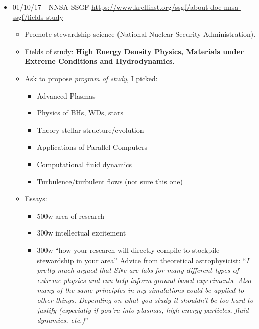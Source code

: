 \documentclass[11pt,
        usenames, %
        dvipsnames %
    ]{article}
\begin{document}
\begin{itemize}
    \item 01/10/17---NNSA SSGF \url{
        https://www.krellinst.org/ssgf/about-doe-nnsa-ssgf/fields-study}
        \begin{itemize}
            \item Promote stewardship science (National Nuclear Security
                Administration).
            \item Fields of study: \textbf{High Energy Density Physics,
                Materials under Extreme Conditions and Hydrodynamics}.
            \item Ask to propose \emph{program of study}, I picked:
                \begin{itemize}
                    \item Advanced Plasmas
                    \item Physics of BHs, WDs, stars
                    \item Theory stellar structure/evolution
                    \item Applications of Parallel Computers
                    \item Computational fluid dynamics
                    \item Turbulence/turbulent flows (not sure this one)
                \end{itemize}
            \item Essays:
                \begin{itemize}
                    \item 500w area of research
                    \item 300w intellectual excitement
                    \item 300w ``how your research will directly compile to
                        stockpile stewardship in your area'' Advice from
                        theoretical astrophysicist: ``\emph{I pretty much argued
                        that SNe are labs for many different types of extreme
                        physics and can help inform ground-based experiments.
                        Also many of the same principles in my simulations could
                        be applied to other things. Depending on what you study
                        it shouldn't be too hard to justify (especially if
                        you're into plasmas, high energy particles, fluid
                        dynamics, etc.)}''
                \end{itemize}
        \end{itemize}


\end{itemize}
\end{document}
